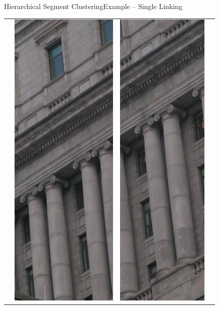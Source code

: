 \documentclass[handout,10pt]{beamer}  %
\begin{document}
\begin{frame}{Hierarchical Segment Clustering}{Example -- Single Linking}
{\begin{center}
\begin{tabular}{>{\centering\arraybackslash}b{} >{\centering\arraybackslash}b{}>{\centering\arraybackslash}b{}>{\centering\arraybackslash}b{}}
		    & \includegraphics[scale=0.25]{./images/clustering/mcgill_20_segment_3.jpg}
		    & \includegraphics[scale=0.25]{./images/clustering/mcgill_20_segment_4.jpg}

\end{tabular}
\end{center}}
\end{frame}
\end{document}
